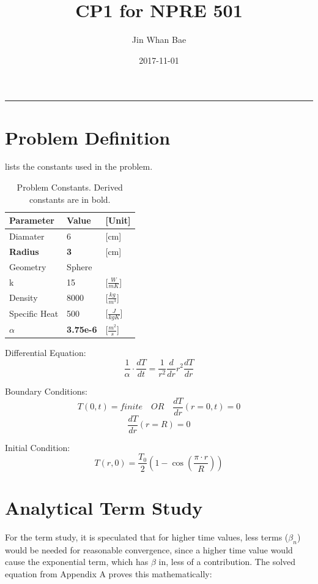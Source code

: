 \documentclass[12pt,letterpaper]{article}
\title{CP1 for NPRE 501}
\author{Jin Whan Bae}
\date{2017-11-01}
\begin{document}
	
	\maketitle
	\hrule
	\onehalfspacing
	\thispagestyle{empty}

\section*{Problem Definition}

 lists the constants used in the problem.


\begin{table}[h]
     \centering
    \begin{tabularx}{\textwidth}{bbb}
       \hline
       Parameter & Value & [Unit] \\
       \hline
       Diamater & 6 & [cm] \\
       \textbf{Radius} & \textbf{3} & [cm] \\
       Geometry & Sphere \\
       k & 15 & [$ \frac{W}{mK} $] \\
       Density & 8000 & [$ \frac{kg}{m^3} $] \\
       Specific Heat & 500 & [$ \frac{J}{kgK} $] \\
       \textbf{$ \alpha$} & \textbf{3.75e-6} & [$ \frac{m^2}{s} $] \\
       \hline
    \end{tabularx}
    \caption {Problem Constants. Derived constants are in bold.}
    \label{tab:constants}
\end{table}

Differential Equation:
\[\frac{1}{\alpha} \cdot \frac{dT}{dt} = \frac{1}{r^2} \frac{d}{dr} r^2 \frac{dT}{dr}\]

Boundary Conditions:
\[T(0,t) = finite \quad OR \quad \frac{dT}{dr} (r = 0, t) = 0\]
\[\frac{dT}{dr} (r = R) = 0 \]

Initial Condition:
\[T(r,0) = \frac{T_0}{2} (1-\cos{(\frac{\pi \cdot r}{R})}) \]


\section*{Analytical Term Study}
For the term study, it is speculated that for higher time values,
less terms ($\beta_n$) would be needed for reasonable convergence,
since a higher time value would cause the exponential term, which has
$\beta$ in, less of a contribution. The solved equation from Appendix A
proves this mathematically:
\end{document}

